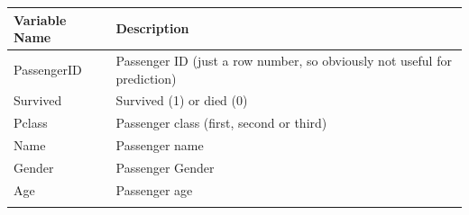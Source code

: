 \documentclass[]{book}
\begin{document}
\begin{longtable}[]{@{}ll@{}}
\toprule
\begin{minipage}[b]{0.49\columnwidth}\raggedright
Variable Name\strut
\end{minipage} & \begin{minipage}[b]{0.45\columnwidth}\raggedright
Description\strut
\end{minipage}\tabularnewline
\midrule
\endhead
\begin{minipage}[t]{0.49\columnwidth}\raggedright
PassengerID\strut
\end{minipage} & \begin{minipage}[t]{0.45\columnwidth}\raggedright
Passenger ID (just a row number, so obviously not useful for prediction)\strut
\end{minipage}\tabularnewline
\begin{minipage}[t]{0.49\columnwidth}\raggedright
Survived\strut
\end{minipage} & \begin{minipage}[t]{0.45\columnwidth}\raggedright
Survived (1) or died (0)\strut
\end{minipage}\tabularnewline
\begin{minipage}[t]{0.49\columnwidth}\raggedright
Pclass\strut
\end{minipage} & \begin{minipage}[t]{0.45\columnwidth}\raggedright
Passenger class (first, second or third)\strut
\end{minipage}\tabularnewline
\begin{minipage}[t]{0.49\columnwidth}\raggedright
Name\strut
\end{minipage} & \begin{minipage}[t]{0.45\columnwidth}\raggedright
Passenger name\strut
\end{minipage}\tabularnewline
\begin{minipage}[t]{0.49\columnwidth}\raggedright
Gender\strut
\end{minipage} & \begin{minipage}[t]{0.45\columnwidth}\raggedright
Passenger Gender\strut
\end{minipage}\tabularnewline
\begin{minipage}[t]{0.49\columnwidth}\raggedright
Age\strut
\end{minipage} & \begin{minipage}[t]{0.45\columnwidth}\raggedright
Passenger age\strut
\end{minipage}\tabularnewline
\begin{minipage}[t]{0.49\columnwidth}\raggedright

\end{minipage}
\end{longtable}
\end{document}
